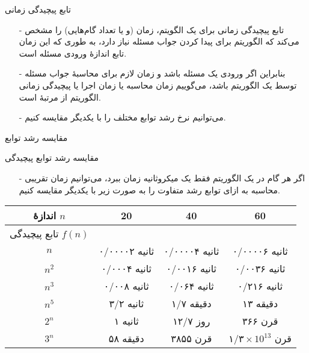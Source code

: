 \begin{frame}{تابع پیچیدگی زمانی}

\begin{itemize}\itmsep{5mm}
\item[-]
تابع پیچیدگی زمانی برای یک الگویتم، زمان (و یا تعداد گام‌هایی) را مشخص می‌کند که الگوریتم برای پیدا کردن جواب مسئله نیاز دارد،
به طوری که این زمان تابع اندازهٔ ورودی مسئله است.
\item[-]
بنابراین اگر ورودی یک مسئله 
 باشد و زمان لازم برای محاسبهٔ جواب مسئله توسط یک الگوریتم 
باشد، می‌گوییم زمان محاسبه
یا زمان اجرا
 یا پیچیدگی زمانی
  الگوریتم از مرتبهٔ 
است.
\item[-]
می‌توانیم نرخ رشد توابع
 مختلف را با یکدیگر مقایسه کنیم.
\end{itemize}

\end{frame}

\begin{frame}{مقایسه رشد توابع}

\begin{figure}[!ht]
\centering

\label{fig:complexity}
\end{figure}

\end{frame}

\begin{frame}{مقایسه رشد توابع پیچیدگی}

\begin{itemize}\itmsep{2mm}
\item[-]
اگر هر گام در یک الگوریتم فقط یک میکروثانیه زمان ببرد، می‌توانیم زمان تقریبی محاسبه به ازای توابع رشد متفاوت را به صورت زیر با یکدیگر مقایسه کنیم.
\end{itemize}

\begin{center}
\begin{tabular}{c | c c c}
اندازهٔ $n$ 
 & 20 & 40 & 60 \\ \hline
تابع پیچیدگی $f(n)$ &  & &
\\
$n$ &
۰/‌۰۰۰۰۲ ثانیه &
۰/‌۰۰۰۰۴ ثانیه &
۰/‌۰۰۰۰۶ ثانیه \\
$n^2$ &
۰/‌۰۰۰۴ ثانیه &
۰/‌۰۰۱۶ ثانیه &
۰/‌۰۰۳۶ ثانیه \\
$n^3$ &
۰/‌۰۰۸ ثانیه &
۰/‌۰۶۴ ثانیه &
۰/‌۲۱۶ ثانیه \\
$n^5$ &
۳/۲ ثانیه &
۱/۷ دقیقه &
۱۳ دقیقه \\
$2^n$ &
۱ ثانیه &
۱۲/۷ روز &
۳۶۶ قرن \\
$3^n$ &
۵۸ دقیقه &
۳۸۵۵ قرن &
$\text{۱/۳} \times 10^{13}$ قرن 
\\
\end{tabular}
\end{center}
\end{frame}

